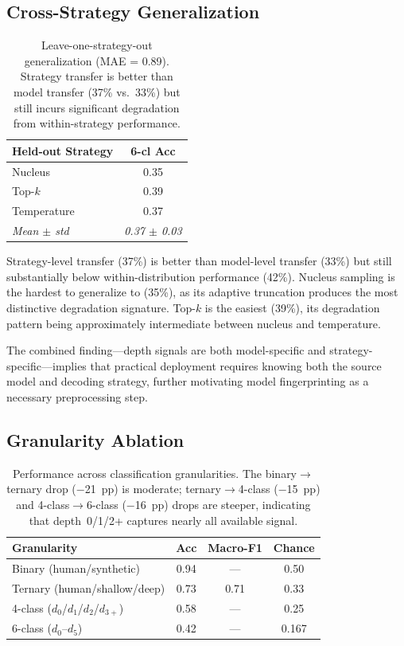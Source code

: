 \documentclass[11pt,a4paper]{article}
\begin{document}
\subsection{Cross-Strategy Generalization}

\begin{table}[t]
\centering
\small
\begin{tabular}{lc}
\toprule
\textbf{Held-out Strategy} & \textbf{6-cl Acc} \\
\midrule
Nucleus & 0.35 \\
Top-$k$ & 0.39 \\
Temperature & 0.37 \\
\midrule
\emph{Mean $\pm$ std} & \emph{0.37 $\pm$ 0.03} \\
\bottomrule
\end{tabular}
\caption{Leave-one-strategy-out generalization (MAE = 0.89). Strategy transfer is better than model transfer (37\% vs.\ 33\%) but still incurs significant degradation from within-strategy performance.}
\label{tab:loo_strategy}
\end{table}

Strategy-level transfer (37\%) is better than model-level transfer (33\%) but still substantially below within-distribution performance (42\%).
Nucleus sampling is the hardest to generalize to (35\%), as its adaptive truncation produces the most distinctive degradation signature.
Top-$k$ is the easiest (39\%), its degradation pattern being approximately intermediate between nucleus and temperature.

The combined finding---depth signals are both model-specific and strategy-specific---implies that practical deployment requires knowing both the source model and decoding strategy, further motivating model fingerprinting as a necessary preprocessing step.

\subsection{Granularity Ablation}

\begin{table}[t]
\centering
\small
\begin{tabular}{lccc}
\toprule
\textbf{Granularity} & \textbf{Acc} & \textbf{Macro-F1} & \textbf{Chance} \\
\midrule
Binary (human/synthetic) & 0.94 & --- & 0.50 \\
Ternary (human/shallow/deep) & 0.73 & 0.71 & 0.33 \\
4-class ($d_0$/$d_1$/$d_2$/$d_{3+}$) & 0.58 & --- & 0.25 \\
6-class ($d_0$--$d_5$) & 0.42 & --- & 0.167 \\
\bottomrule
\end{tabular}
\caption{Performance across classification granularities. The binary$\to$ternary drop ($-$21~pp) is moderate; ternary$\to$4-class ($-$15~pp) and 4-class$\to$6-class ($-$16~pp) drops are steeper, indicating that depth~0/1/2+ captures nearly all available signal.}
\label{tab:granularity}
\end{table}
\end{document}
